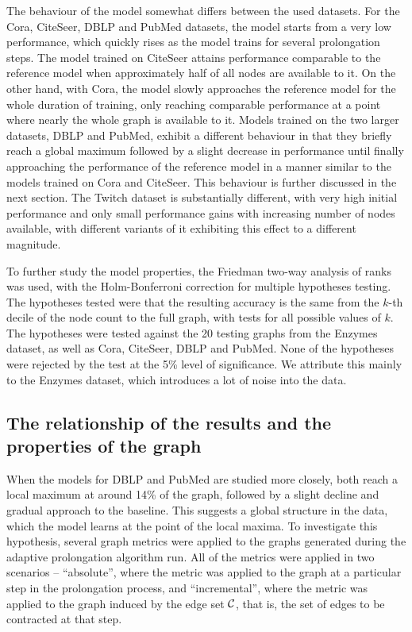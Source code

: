 The behaviour of the model somewhat differs between the used datasets. For the Cora, CiteSeer, DBLP and PubMed datasets, the model starts from a very low performance, which quickly rises as the model trains for several prolongation steps. The model trained on CiteSeer attains performance comparable to the reference model when approximately half of all nodes are available to it. On the other hand, with Cora, the model slowly approaches the reference model for the whole duration of training, only reaching comparable performance at a point where nearly the whole graph is available to it. Models trained on the two larger datasets, DBLP and PubMed, exhibit a different behaviour in that they briefly reach a global maximum followed by a slight decrease in performance until finally approaching the performance of the reference model in a manner similar to the models trained on Cora and CiteSeer. This behaviour is further discussed in the next section. The Twitch dataset is substantially different, with very high initial performance and only small performance gains with increasing number of nodes available, with different variants of it exhibiting this effect to a different magnitude.

To further study the model properties, the Friedman two-way analysis of ranks was used, with the Holm-Bonferroni correction for multiple hypotheses testing. The hypotheses tested were that the resulting accuracy is the same from the \( k \)-th decile of the node count to the full graph, with tests for all possible values of \( k \). The hypotheses were tested against the 20 testing graphs from the Enzymes dataset, as well as Cora, CiteSeer, DBLP and PubMed. None of the hypotheses were rejected by the test at the 5\% level of significance. We attribute this mainly to the Enzymes dataset, which introduces a lot of noise into the data.

\subsection{The relationship of the results and the properties of the graph}

When the models for DBLP and PubMed are studied more closely, both reach a local maximum at around 14\% of the graph, followed by a slight decline and gradual approach to the baseline. This suggests a global structure in the data, which the model learns at the point of the local maxima. To investigate this hypothesis, several graph metrics were applied to the graphs generated during the adaptive prolongation algorithm run. All of the metrics were applied in two scenarios -- \enquote{absolute}, where the metric was applied to the graph at a particular step in the prolongation process, and \enquote{incremental}, where the metric was applied to the graph induced by the edge set \( \mathcal{C} \), that is, the set of edges to be contracted at that step.

